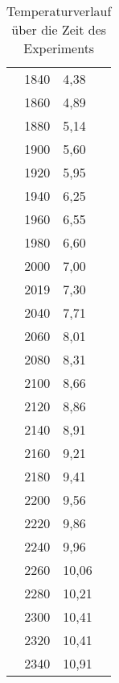 \begin{footnotesize}
\begin{table}[h]
\begin{tabular}{rl}
1840	&	4,38\\
1860	&	4,89\\
1880	&	5,14\\
1900	&	5,60\\
1920	&	5,95\\
1940	&	6,25\\
1960	&	6,55\\
1980	&	6,60\\
2000	&	7,00\\
2019	&	7,30\\
2040	&	7,71\\
2060	&	8,01\\
2080	&	8,31\\
2100	&	8,66\\
2120	&	8,86\\
2140	&	8,91\\
2160	&	9,21\\
2180	&	9,41\\
2200	&	9,56\\
2220	&	9,86\\
2240	&	9,96\\
2260	&	10,06\\
2280	&	10,21\\
2300	&	10,41\\
2320	&	10,41\\
2340	&	10,91\\
\end{tabular}
\caption{Temperaturverlauf über die Zeit des Experiments}
\end{table}
\end{footnotesize}
